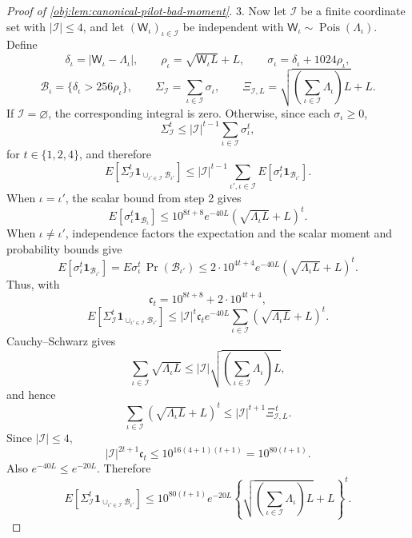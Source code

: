 \documentclass[11pt]{article}
\begin{document}
\begin{proof}[Proof of \cref{obj:lem:canonical-pilot-bad-moment}]
3.  Now let \(\mathcal I\) be a finite coordinate set with
\(|\mathcal I|\le4\), and let
\((\mathsf W_\iota)_{\iota\in\mathcal I}\) be independent with
\(\mathsf W_\iota\sim\operatorname{Pois}(\Lambda_\iota)\).  Define
\[
\delta_\iota=|\mathsf W_\iota-\Lambda_\iota|,
\qquad
\rho_\iota=\sqrt{\mathsf W_\iota L}+L,
\qquad
\sigma_\iota=\delta_\iota+1024\rho_\iota,
\]
\[
\mathcal B_\iota=\{\delta_\iota>256\rho_\iota\},
\qquad
\Sigma_{\mathcal I}=\sum_{\iota\in\mathcal I}\sigma_\iota,
\qquad
\Xi_{\mathcal I,L}
=
\sqrt{\left(\sum_{\iota\in\mathcal I}\Lambda_\iota\right)L}+L .
\]
If \(\mathcal I=\varnothing\), the corresponding integral is zero.  Otherwise,
since each \(\sigma_\iota\ge0\),
\[
\Sigma_{\mathcal I}^t
\le
|\mathcal I|^{t-1}
\sum_{\iota\in\mathcal I}\sigma_\iota^t ,
\]
for \(t\in\{1,2,4\}\), and therefore
\[
E\!\left[
\Sigma_{\mathcal I}^t
\mathbf 1_{\cup_{\iota'\in\mathcal I}\mathcal B_{\iota'}}
\right]
\le
|\mathcal I|^{t-1}
\sum_{\iota',\iota\in\mathcal I}
E\!\left[
\sigma_\iota^t\mathbf 1_{\mathcal B_{\iota'}}
\right].
\]
When \(\iota=\iota'\), the scalar bound from step 2 gives
\[
E\!\left[\sigma_\iota^t\mathbf 1_{\mathcal B_\iota}\right]
\le
10^{8t+8}e^{-40L}
\left(\sqrt{\Lambda_\iota L}+L\right)^t.
\]
When \(\iota\ne\iota'\), independence factors the expectation and the scalar
moment and probability bounds give
\[
E\!\left[
\sigma_\iota^t\mathbf 1_{\mathcal B_{\iota'}}
\right]
=
E\sigma_\iota^t\,\Pr(\mathcal B_{\iota'})
\le
2\cdot10^{4t+4}e^{-40L}
\left(\sqrt{\Lambda_\iota L}+L\right)^t.
\]
Thus, with
\[
\mathfrak c_t=10^{8t+8}+2\cdot10^{4t+4},
\]
\[
E\!\left[
\Sigma_{\mathcal I}^t
\mathbf 1_{\cup_{\iota'\in\mathcal I}\mathcal B_{\iota'}}
\right]
\le
|\mathcal I|^t\mathfrak c_t e^{-40L}
\sum_{\iota\in\mathcal I}
\left(\sqrt{\Lambda_\iota L}+L\right)^t .
\]
Cauchy--Schwarz gives
\[
\sum_{\iota\in\mathcal I}\sqrt{\Lambda_\iota L}
\le
|\mathcal I|
\sqrt{\left(\sum_{\iota\in\mathcal I}\Lambda_\iota\right)L},
\]
and hence
\[
\sum_{\iota\in\mathcal I}
\left(\sqrt{\Lambda_\iota L}+L\right)^t
\le
|\mathcal I|^{t+1}\Xi_{\mathcal I,L}^{\,t}.
\]
Since \(|\mathcal I|\le4\),
\[
|\mathcal I|^{2t+1}\mathfrak c_t
\le
10^{16(4+1)(t+1)}
=
10^{80(t+1)}.
\]
Also \(e^{-40L}\le e^{-20L}\).  Therefore
\[
E\!\left[
\Sigma_{\mathcal I}^t
\mathbf 1_{\cup_{\iota'\in\mathcal I}\mathcal B_{\iota'}}
\right]
\le
10^{80(t+1)}e^{-20L}
\left\{
\sqrt{\left(\sum_{\iota\in\mathcal I}\Lambda_\iota\right)L}+L
\right\}^{t}.
\]


\end{proof}
\end{document}
